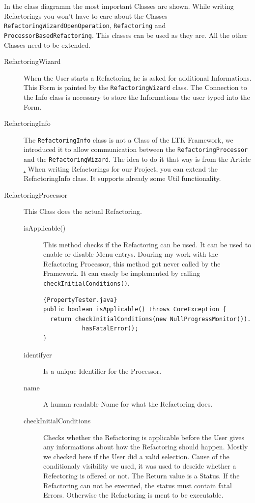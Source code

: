 \documentclass[a4paper,10pt]{report}
\begin{document}
In the class diagramm the most important Classes are shown. While writing Refactorings you won't have to care about the Classes \verb!RefactoringWizardOpenOperation!, \verb!Refactoring! and \verb!ProcessorBasedRefactoring!. This 
classes can be used as they are. All the other Classes need to be extended.
\begin{description}
 \item[RefactoringWizard] When the User starts a Refactoring he is asked for additional Informations. This Form is painted by the \verb!RefactoringWizard! class.
The Connection to the Info class is necessary to store the Informations the user typed into the Form. 
 \item[RefactoringInfo] The \verb!RefactoringInfo! class is not a Class of the LTK Framework, we introduced it to allow communication between the \verb!RefactoringProcessor! and the \verb!RefactoringWizard!. 
The idea to do it that way is from the Article \href{http://www.eclipse.org/articles/Article-LTK/ltk.html}. When writing Refactorings for our Project, you can extend the 
RefactoringInfo class. It supports already some Util functionality.
 \item[RefactoringProcessor] This Class does the actual Refactoring. 
\begin{description}
 \item[isApplicable()] This method checks if the Refactoring can be used. It can be used to enable or disable Menu entrys. Douring my work with the Refactoring Processor, this 
method got never called by the Framework. It can easely be implemented by calling \verb!checkInitialConditions()!.
\begin{lstlisting}[caption=Generic isApplicable Implementation]{PropertyTester.java}
public boolean isApplicable() throws CoreException {
  return checkInitialConditions(new NullProgressMonitor()).
           hasFatalError();
}
\end{lstlisting}
\item[identifyer] Is a unique Identifier for the Processor.
\item[name] A human readable Name for what the Refactoring does.
\item[checkInitialConditions] Checks whether the Refactoring is applicable before the User gives any informations about how the Refactoring should happen. Mostly we checked
here if the User did a valid selection. Cause of the conditionaly visibility we used, it was used to descide whether a Refectoring is offered or not.
The Return value is a Status. If the Refactoring can not be executed, the status must contain fatal Errors. Otherwise the Refactoring is ment to be executable.

\end{description}
\end{description}
\end{document}
